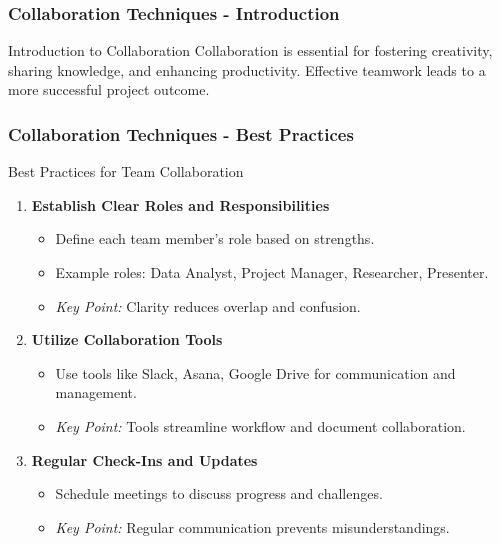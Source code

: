 \documentclass[aspectratio=169]{beamer}
\begin{document}
\begin{frame}[fragile]
  \frametitle{Collaboration Techniques - Introduction}
  \begin{block}{Introduction to Collaboration}
    Collaboration is essential for fostering creativity, sharing knowledge, and enhancing productivity. Effective teamwork leads to a more successful project outcome.
  \end{block}
\end{frame}

\begin{frame}[fragile]
  \frametitle{Collaboration Techniques - Best Practices}
  \begin{block}{Best Practices for Team Collaboration}
    \begin{enumerate}
      \item \textbf{Establish Clear Roles and Responsibilities}
        \begin{itemize}
          \item Define each team member's role based on strengths.
          \item Example roles: Data Analyst, Project Manager, Researcher, Presenter.
          \item \textit{Key Point:} Clarity reduces overlap and confusion.
        \end{itemize}
      \item \textbf{Utilize Collaboration Tools}
        \begin{itemize}
          \item Use tools like Slack, Asana, Google Drive for communication and management.
          \item \textit{Key Point:} Tools streamline workflow and document collaboration.
        \end{itemize}
      \item \textbf{Regular Check-Ins and Updates}
        \begin{itemize}
          \item Schedule meetings to discuss progress and challenges.
          \item \textit{Key Point:} Regular communication prevents misunderstandings.
        \end{itemize}
    \end{enumerate}
  \end{block}
\end{frame}
\end{document}
